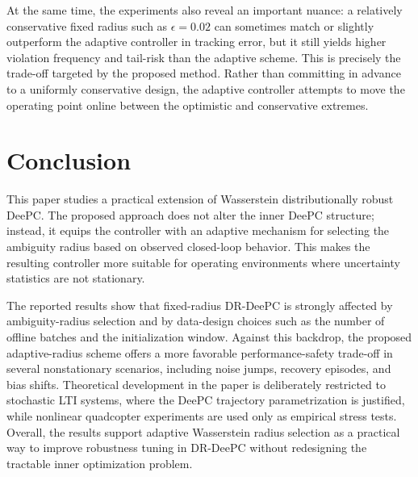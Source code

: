 \documentclass[conference]{IEEEtran}
\begin{document}
At the same time, the experiments also reveal an important nuance: a relatively conservative fixed radius such as $\epsilon=0.02$ can sometimes match or slightly outperform the adaptive controller in tracking error, but it still yields higher violation frequency and tail-risk than the adaptive scheme. This is precisely the trade-off targeted by the proposed method. Rather than committing in advance to a uniformly conservative design, the adaptive controller attempts to move the operating point online between the optimistic and conservative extremes.

\section{Conclusion}
This paper studies a practical extension of Wasserstein distributionally robust DeePC. The proposed approach does not alter the inner DeePC structure; instead, it equips the controller with an adaptive mechanism for selecting the ambiguity radius based on observed closed-loop behavior. This makes the resulting controller more suitable for operating environments where uncertainty statistics are not stationary.

The reported results show that fixed-radius DR-DeePC is strongly affected by ambiguity-radius selection and by data-design choices such as the number of offline batches and the initialization window. Against this backdrop, the proposed adaptive-radius scheme offers a more favorable performance-safety trade-off in several nonstationary scenarios, including noise jumps, recovery episodes, and bias shifts. Theoretical development in the paper is deliberately restricted to stochastic LTI systems, where the DeePC trajectory parametrization is justified, while nonlinear quadcopter experiments are used only as empirical stress tests. Overall, the results support adaptive Wasserstein radius selection as a practical way to improve robustness tuning in DR-DeePC without redesigning the tractable inner optimization problem.



\end{document}
